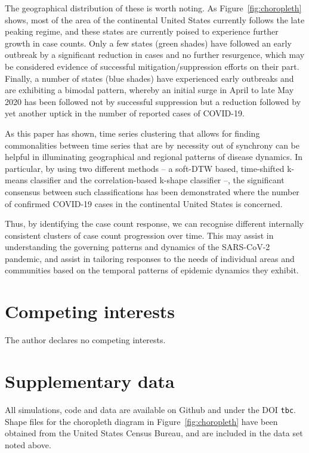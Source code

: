 \documentclass{article}
\begin{document}
The geographical distribution of these is worth noting. As Figure~\ref{fig:choropleth} shows, most of the area of the continental United States currently follows the late peaking regime, and these states are currently poised to experience further growth in case counts. Only a few states (green shades) have followed an early outbreak by a significant reduction in cases and no further resurgence, which may be considered evidence of successful mitigation/suppression efforts on their part. Finally, a number of states (blue shades) have experienced early outbreaks and are exhibiting a bimodal pattern, whereby an initial surge in April to late May 2020 has been followed not by successful suppression but a reduction followed by yet another uptick in the number of reported cases of COVID-19.

As this paper has shown, time series clustering that allows for finding commonalities between time series that are by necessity out of synchrony can be helpful in illuminating geographical and regional patterns of disease dynamics. In particular, by using two different methods -- a soft-DTW based, time-shifted k-means classifier and the correlation-based k-shape classifier --, the significant consensus between such classifications has been demonstrated where the number of confirmed COVID-19 cases in the continental United States is concerned. 

Thus, by identifying the case count response, we can recognise different internally consistent clusters of case count progression over time. This may assist in understanding the governing patterns and dynamics of the SARS-CoV-2 pandemic, and assist in tailoring responses to the needs of individual areas and communities based on the temporal patterns of epidemic dynamics they exhibit.


\section*{Competing interests} %
\label{sec:competing_interests}

The author declares no competing interests.


\section*{Supplementary data} %
\label{sec:supplementary_data}

All simulations, code and data are available on Github and under the DOI \texttt{tbc}. Shape files for the choropleth diagram in Figure~\ref{fig:choropleth} have been obtained from the United States Census Bureau, and are included in the data set noted above.



\end{document}
